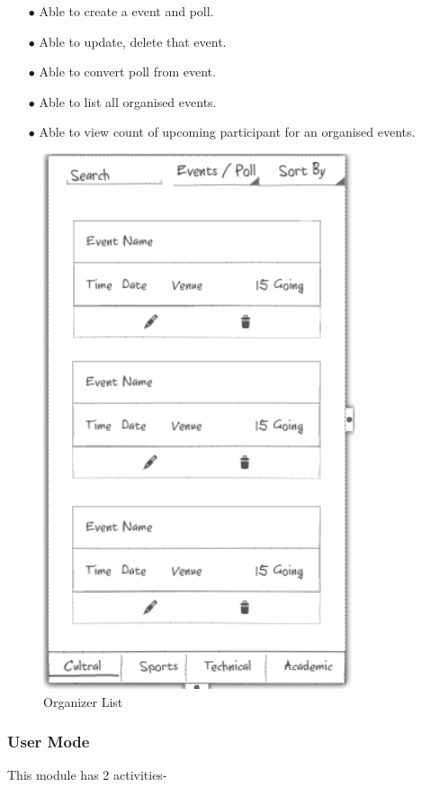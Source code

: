 \documentclass{article}
\begin{document}
\begin{itemize}
\item[$\bullet$] Able to create a event and poll.
\item[$\bullet$] Able to update, delete that event.
\item[$\bullet$] Able to convert poll from event.
\item[$\bullet$] Able to list all organised events.
\item[$\bullet$] Able to view count of upcoming participant for an organised events.
\end{itemize}
\begin{figure}[h]
    \centering
    \includegraphics[scale=0.3]{OM.png}
    \caption{Organizer List}
\end{figure}
\subsubsection{User Mode}
This module has 2 activities- 
\end{document}

